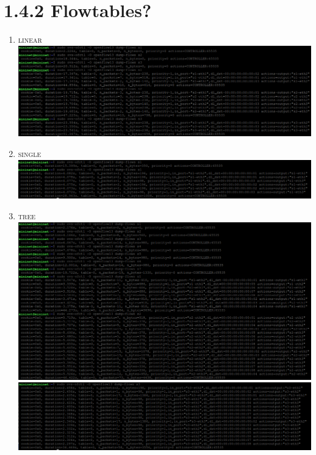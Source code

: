 \documentclass{article}
\begin{document}
	\section*{1.4.2 Flowtables?}
	\begin{adjustwidth}{2em}{2em}
		\begin{enumerate}
			\item \textsc{linear} \\
			\includegraphics[scale=0.42]{linear_flowtables.png}
			\item \textsc{single} \\
			\includegraphics[scale=0.42]{single_flowtables.png}
			\item \textsc{tree} \\
			\includegraphics[scale=0.42]{tree_flowtables_1.png} \\
			\includegraphics[scale=0.42]{tree_flowtables_2.png} \\

\end{enumerate}
\end{adjustwidth}
\end{document}
